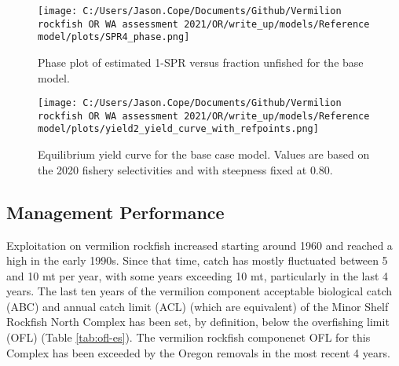 \documentclass[11pt,
  english,
  a4paper,
]{article}
\begin{document}

\begin{figure}
\centering
\texttt{[image: C:/Users/Jason.Cope/Documents/Github/Vermilion rockfish OR WA assessment 2021/OR/write\_up/models/Reference model/plots/SPR4\_phase.png]}
\caption{Phase plot of estimated 1-SPR versus fraction unfished for the base model.\label{fig:es-phase}}
\end{figure}

\tagmcend\tagstructend


\begin{figure}
\centering
\texttt{[image: C:/Users/Jason.Cope/Documents/Github/Vermilion rockfish OR WA assessment 2021/OR/write\_up/models/Reference model/plots/yield2\_yield\_curve\_with\_refpoints.png]}
\caption{Equilibrium yield curve for the base case model. Values are based on the 2020 fishery selectivities and with steepness fixed at 0.80.\label{fig:es-yield}}
\end{figure}

\tagmcend\tagstructend



\clearpage


\hypertarget{management-performance}{%
\subsection*{Management Performance}\label{management-performance}}

\leavevmode\tagmcend\tagstructend


Exploitation on vermilion rockfish increased starting around 1960 and reached a high in the early 1990s. Since that time, catch has mostly fluctuated between 5 and 10 mt per year, with some years exceeding 10 mt, particularly in the last 4 years. The last ten years of the vermilion component acceptable biological catch (ABC) and annual catch limit (ACL) (which are equivalent) of the Minor Shelf Rockfish North Complex has been set, by definition, below the overfishing limit (OFL) (Table \ref{tab:ofl-es}). The vermilion rockfish componenet OFL for this Complex has been exceeded by the Oregon removals in the most recent 4 years.
\end{document}
